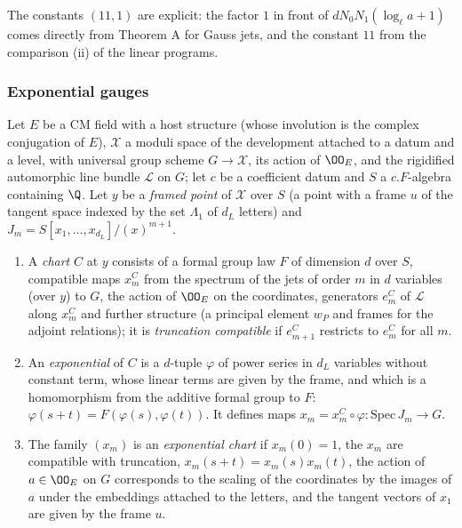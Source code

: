 \begin{remark}\label{pf:sh-curv:split-rem}
The constants $(11,1)$ are explicit: the factor $1$ in front of $dN_0N_1(\log_\ell a+1)$ comes directly from Theorem A for
Gauss jets, and the constant $11$ from the comparison (ii) of the linear programs.
\end{remark}

\subsubsection{Exponential gauges}

\begin{definition}\label{pf:sh-curv:expdef}
Let $E$ be a CM field with a host structure (whose involution is the complex conjugation of $E$), $\mathcal X$ a moduli space
of the development attached to a datum and a level, with universal group scheme $G\to\mathcal X$, its action of $\OO_E$, and
the rigidified automorphic line bundle $\mathcal L$ on $G$; let $c$ be a coefficient datum and $S$ a $c.F$-algebra containing
$\Q$. Let $y$ be a \emph{framed point} of $\mathcal X$ over $S$ (a point with a frame $u$ of the tangent space indexed by the
set $\Lambda_1$ of $d_L$ letters) and $J_m=S[x_1,\dots,x_{d_L}]/(x)^{m+1}$.
\begin{enumerate}[label=(\alph*)]
\item A \emph{chart} $C$ at $y$ consists of a formal group law $F$ of dimension $d$ over $S$, compatible maps $x^C_m$ from
the spectrum of the jets of order $m$ in $d$ variables (over $y$) to $G$, the action of $\OO_E$ on the coordinates,
generators $e^C_m$ of $\mathcal L$ along $x^C_m$ and further structure (a principal element $w_P$ and frames for the adjoint
relations); it is \emph{truncation compatible} if $e^C_{m+1}$ restricts to $e^C_m$ for all $m$.
\item An \emph{exponential} of $C$ is a $d$-tuple $\varphi$ of power series in $d_L$ variables without constant term, whose
linear terms are given by the frame, and which is a homomorphism from the additive formal group to $F$:
$\varphi(s+t)=F(\varphi(s),\varphi(t))$. It defines maps $x_m=x^C_m\circ\varphi\colon\mathrm{Spec}\,J_m\to G$.
\item The family $(x_m)$ is an \emph{exponential chart} if $x_m(0)=1$, the $x_m$ are compatible with truncation,
$x_m(s+t)=x_m(s)x_m(t)$, the action of $a\in\OO_E$ on $G$ corresponds to the scaling of the coordinates by the images of $a$
under the embeddings attached to the letters, and the tangent vectors of $x_1$ are given by the frame $u$.

\end{enumerate}
\end{definition}
